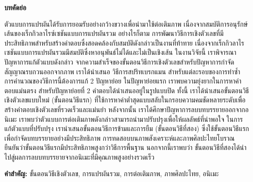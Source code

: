 \thispagestyle{empty}
\vspace{2 cm}
{\huge \bf บทคัดย่อ}

\vspace{2 cm}

\hspace{1cm} ตัวแบบการแปรผันได้รับการยอมรับอย่างกว้างขวางเพื่อนำมาใช้ต่อเติมภาพ เนื่องจากสมบัติการอนุรักษ์เส้นของเร็กกิวลาไรซ์เซชันแบบการแปรผันรวม อย่างไรก็ตาม การพัฒนาวิธีการเชิงตัวเลขที่มีประสิทธิภาพสำหรับสร้างคำตอบซึ่งสอดคล้องกับสมบัติดังกล่าวเป็นงานที่ท้าทาย เนื่องจากเร็กกิวลาไรเซชันแบบการแปรผันรวมมีสมบัติซึ่งหาอนุพันธ์ไม่ได้และไม่เป็นเชิงเส้น ในงานวิจัยนี้ เราพิจารณาปัญหาการแก้ตัวแบบดังกล่าว จากความสำเร็จของขั้นตอนวิธีการเชิงตัวเลขสำหรับปัญหาการกำจัดสัญญาณรบกวนออกจากภาพ เราได้นำเสนอ \break วิธีการสปริทเบรกแมน สำหรับแต่ละรอบของการทำซ้ำ การคำนวณของวิธีการนี้ต้องการแก้ 2 ปัญหาย่อย ในปัญหาย่อยแรก เราพบความยุ่งยากในการหาคำตอบแม่นตรง สำหรับปัญหาย่อยที่ 2 คำตอบได้นำเสนออยู่ในรูปแบบปิด ทั้งนี้ เราได้นำเสนอขั้นตอนวิธีเชิงตัวเลขแบบใหม่ (ขั้นตอนวิธีแรก) ที่ใช้การหาค่าต่ำสุดแบบสลับในกรอบความคมชัดหลายระดับเพื่อสร้างคำตอบเชิงตัวเลขที่รวดเร็วและแม่นยำ หลังจากนั้น เราได้ศึกษาปัญหาการลบบทบรรยายออกจากอนิเมะ เราพบว่าตัวแบบการต่อเติมภาพดังกล่าวสามารถนำมาปรับปรุงเพื่อให้ผลลัพธ์ที่น่าพอใจ ในการแก้ตัวแบบที่ปรับปรุง เรานำเสนอขั้นตอนวิธีการข้ามและการยืม (ขั้นตอนวิธีที่สอง) ซึ่งใช้ขั้นตอนวิธีแรกเพื่อกำจัดบทบรรยายอย่างมีประสิทธิภาพ การทดสอบบนภาพสังเคราะห์และภาพศิลปะไทยโบราณยืนยันว่าขั้นตอนวิธีแรกมีประสิทธิภาพสูงกว่าวิธีการพื้นฐาน นอกจากนี้เราพบว่า ขั้นตอนวิธีที่สองได้นำไปสู่ผลการลบบทบรรยายจากอนิเมะที่มีคุณภาพสูงอย่างรวดเร็ว

\vspace{1 cm}
{\bf{คำสำคัญ:}} ขั้นตอนวิธีเชิงตัวเลข, การแปรผันรวม, การต่อเติมภาพ, ภาพศิลปะไทย, อนิเมะ\\
\newpage